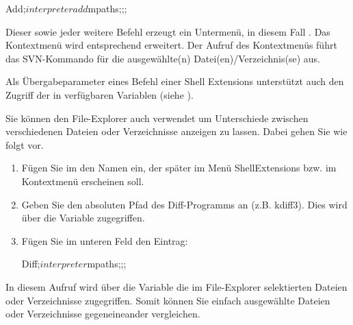 \begin{code}
 Add;$interpreter add $mpaths;;;
\end{code}

Dieser sowie jeder weitere Befehl erzeugt ein Untermenü, in diesem Fall . Das Kontextmenü wird entsprechend erweitert. Der Aufruf des Kontextmenüs führt das SVN-Kommando  für die ausgewählte(n) Datei(en)/Verzeichnis(se) aus.

Als Übergabeparameter eines Befehl einer Shell Extensions unterstützt auch den Zugriff der in \codeblocks verfügbaren Variablen (siehe ).



Sie können den File-Explorer auch verwendet um Unterschiede zwischen verschiedenen Dateien oder Verzeichnisse anzeigen zu lassen. Dabei gehen Sie wie folgt vor.

\begin{enumerate}
\item Fügen Sie im  den Namen ein, der später im Menü ShellExtensions bzw. im Kontextmenü erscheinen soll.
\item Geben Sie den absoluten Pfad des Diff-Programms an (z.B. kdiff3). Dies wird über die Variable  zugegriffen.
\item Fügen Sie im unteren Feld den Eintrag:
\begin{cmd}
Diff;$interpreter $mpaths;;;
\end{cmd}
\end{enumerate}

In diesem Aufruf wird über die Variable  die im File-Explorer selektierten Dateien oder Verzeichnisse zugegriffen. Somit können Sie einfach ausgewählte Dateien oder Verzeichnisse gegeneineander vergleichen.

%
%
%
%

